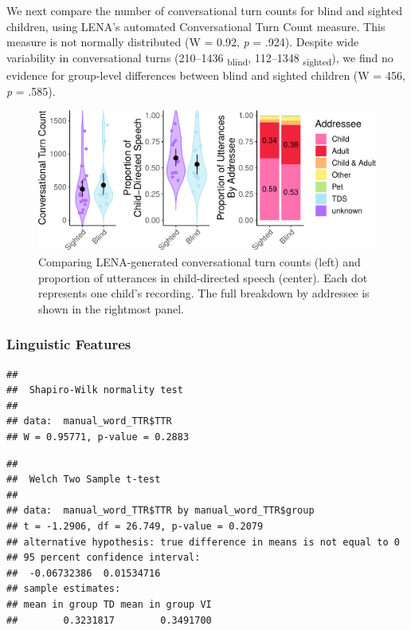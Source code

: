 \documentclass[
  man,floatsintext]{apa6}
\begin{document}
We next compare the number of conversational turn counts for blind and sighted children, using LENA's automated Conversational Turn Count measure. This measure is not normally distributed (W = 0.92, \emph{p} = .924). Despite wide variability in conversational turns (210--1436 \textsubscript{blind}, 112--1348 \textsubscript{sighted}), we find no evidence for group-level differences between blind and sighted children (W = 456, \emph{p} = .585).

\begin{figure}
\centering
\includegraphics{input_quality_manuscript_files/figure-latex/interactiveness-plots-1.pdf}
\caption{\label{fig:interactiveness-plots}Comparing LENA-generated conversational turn counts (left) and proportion of utterances in child-directed speech (center). Each dot represents one child's recording. The full breakdown by addressee is shown in the rightmost panel.}
\end{figure}

\hypertarget{linguistic-features}{%
\subsubsection{Linguistic Features}\label{linguistic-features}}

\begin{verbatim}
## 
##  Shapiro-Wilk normality test
## 
## data:  manual_word_TTR$TTR
## W = 0.95771, p-value = 0.2883
\end{verbatim}

\begin{verbatim}
## 
##  Welch Two Sample t-test
## 
## data:  manual_word_TTR$TTR by manual_word_TTR$group
## t = -1.2906, df = 26.749, p-value = 0.2079
## alternative hypothesis: true difference in means is not equal to 0
## 95 percent confidence interval:
##  -0.06732386  0.01534716
## sample estimates:
## mean in group TD mean in group VI 
##        0.3231817        0.3491700
\end{verbatim}
\end{document}
